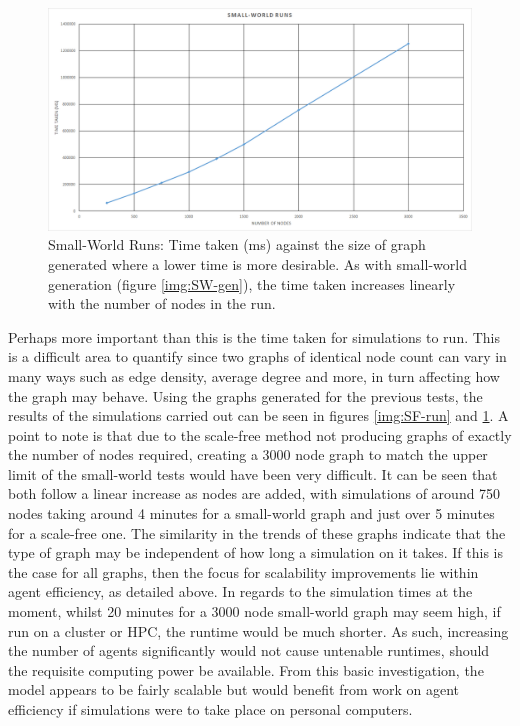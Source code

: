 \documentclass[]{report}
\begin{document}
\begin{figure}
\begin{center}
\includegraphics[width=\textwidth]{small-world-runs.png}
\end{center}
\caption{Small-World Runs: Time taken (ms) against the size of graph generated where a lower time is more desirable. As with small-world generation (figure \ref{img:SW-gen}), the time taken increases linearly with the number of nodes in the run.}
\label{img:SW-run}
\end{figure}

Perhaps more important than this is the time taken for simulations to run. This is a difficult area to quantify since two graphs of identical node count can vary in many ways such as edge density, average degree and more, in turn affecting how the graph may behave. Using the graphs generated for the previous tests, the results of the simulations carried out can be seen in figures \ref{img:SF-run} and \ref{img:SW-run}. A point to note is that due to the scale-free method not producing graphs of exactly the number of nodes required, creating a 3000 node graph to match the upper limit of the small-world tests would have been very difficult. It can be seen that both follow a linear increase as nodes are added, with simulations of around 750 nodes taking around 4 minutes for a small-world graph and just over 5 minutes for a scale-free one. The similarity in the trends of these graphs indicate that the type of graph may be independent of how long a simulation on it takes. If this is the case for all graphs, then the focus for scalability improvements lie within agent efficiency, as detailed above. In regards to the simulation times at the moment, whilst 20 minutes for a 3000 node small-world graph may seem high, if run on a cluster or HPC, the runtime would be much shorter. As such, increasing the number of agents significantly would not cause untenable runtimes, should the requisite computing power be available. From this basic investigation, the model appears to be fairly scalable but would benefit from work on agent efficiency if simulations were to take place on personal computers.
\end{document}
